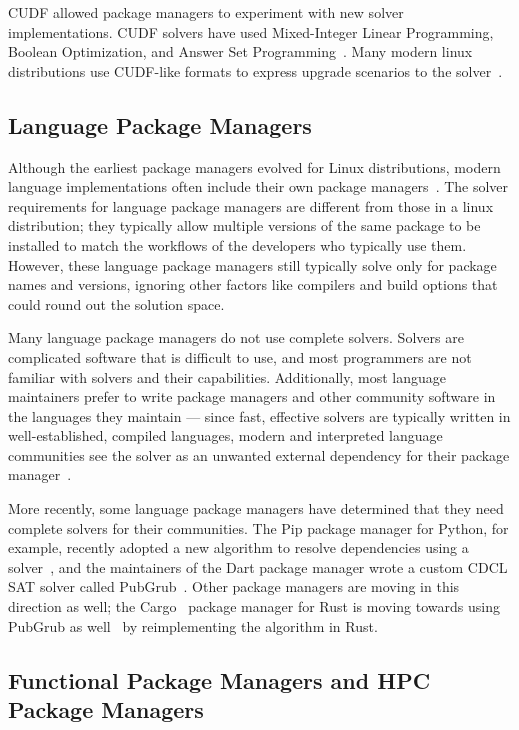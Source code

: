 CUDF allowed package managers to experiment with new solver implementations.
CUDF solvers have used Mixed-Integer Linear Programming, Boolean Optimization, and Answer Set Programming~\cite{michel+:lococo2010,argelich+:lococo2010,gebser+:2011-aspcud}.
Many modern linux distributions use CUDF-like formats to express upgrade scenarios to the solver~\cite{abate2020dependency}.

\subsection{Language Package Managers}

Although the earliest package managers evolved for Linux distributions, modern language implementations often include their own package managers~\cite{npm,pip,cargo,weizenbaum:pubgrub18}.
The solver requirements for language package managers are different from those in a linux distribution; they typically allow multiple versions of the same package to be installed to match the workflows of the developers who typically use them.
However, these language package managers still typically solve only for package names and versions, ignoring other factors like compilers and build options that could round out the solution space.

Many language package managers do not use complete solvers.
Solvers are complicated software that is difficult to use, and most programmers are not familiar with solvers and their capabilities.
Additionally, most language maintainers prefer to write package managers and other community software in the languages they maintain --- since fast, effective solvers are typically written in well-established, compiled languages, modern and interpreted language communities see the solver as an unwanted external dependency for their package manager~\cite{abate2020dependency}.

More recently, some language package managers have determined that they need complete solvers for their communities. The Pip package manager for Python, for example, recently adopted a new algorithm to resolve dependencies using a solver~\cite{pip-new-resolver}, and the maintainers of the Dart package manager wrote a custom CDCL SAT solver called PubGrub~\cite{weizenbaum:pubgrub18}.
Other package managers are moving in this direction as well; the Cargo~\cite{cargo} package manager for Rust is moving towards using PubGrub as well~\cite{pubgrub-rs} by reimplementing the algorithm in Rust.

\subsection{Functional Package Managers and HPC Package Managers}

